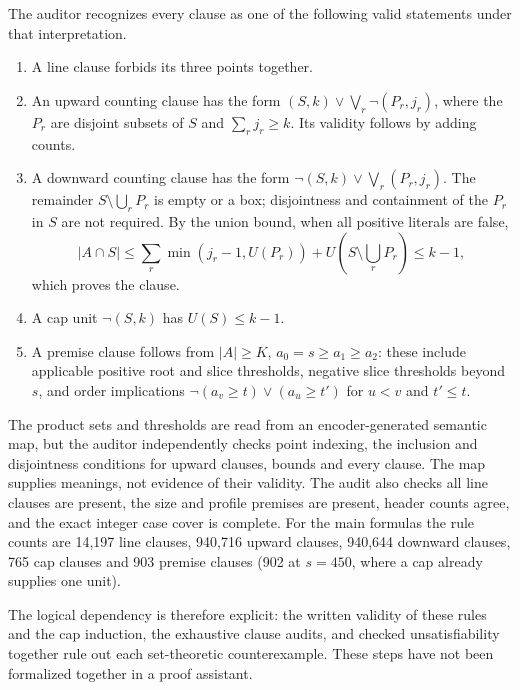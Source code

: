 \documentclass[11pt]{article}
\begin{document}
The auditor recognizes every clause as one of the following valid statements under that interpretation.
\begin{enumerate}
\item A line clause forbids its three points together.
\item An upward counting clause has the form $(S,k)\vee\bigvee_r\neg(P_r,j_r)$, where the $P_r$ are disjoint subsets of $S$ and $\sum_r j_r\geq k$. Its validity follows by adding counts.
\item A downward counting clause has the form $\neg(S,k)\vee\bigvee_r(P_r,j_r)$. The remainder $S\setminus\bigcup_rP_r$ is empty or a box; disjointness and containment of the $P_r$ in $S$ are not required. By the union bound, when all positive literals are false,
\[
|A\cap S|\leq\sum_r\min(j_r-1,U(P_r))+U(S\setminus\textstyle\bigcup_rP_r)\leq k-1,
\]
which proves the clause.
\item A cap unit $\neg(S,k)$ has $U(S)\leq k-1$.
\item A premise clause follows from $|A|\geq K$, $a_0=s\geq a_1\geq a_2$: these include applicable positive root and slice thresholds, negative slice thresholds beyond $s$, and order implications $\neg(a_v\geq t)\vee(a_u\geq t')$ for $u<v$ and $t'\leq t$.
\end{enumerate}
The product sets and thresholds are read from an encoder-generated semantic map, but the auditor independently checks point indexing, the inclusion and disjointness conditions for upward clauses, bounds and every clause. The map supplies meanings, not evidence of their validity. The audit also checks all line clauses are present, the size and profile premises are present, header counts agree, and the exact integer case cover is complete. For the main formulas the rule counts are 14,197 line clauses, 940,716 upward clauses, 940,644 downward clauses, 765 cap clauses and 903 premise clauses (902 at $s=450$, where a cap already supplies one unit).

The logical dependency is therefore explicit: the written validity of these rules and the cap induction, the exhaustive clause audits, and checked unsatisfiability together rule out each set-theoretic counterexample. These steps have not been formalized together in a proof assistant.
\end{document}
